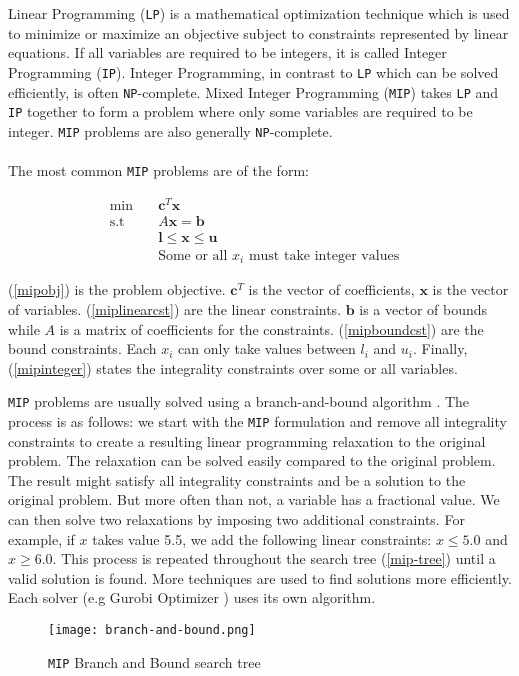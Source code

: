 \documentclass[../../thesis.tex]{subfiles}
\begin{document}
Linear Programming (\texttt{LP}) is a mathematical optimization technique which is used to minimize or maximize 
an objective subject to constraints represented by linear equations. 
If all variables are required to be integers, it is called Integer Programming (\texttt{IP}). 
Integer Programming, in contrast to \texttt{LP} which can be solved efficiently, is often \texttt{NP}-complete.  
Mixed Integer Programming (\texttt{MIP}) takes \texttt{LP} and \texttt{IP} together to form a problem where only some variables 
are required to be integer. \texttt{MIP} problems are also generally \texttt{NP}-complete.

\paragraph{}

The most common \texttt{MIP} problems are of the form:

\begin{align}
  \textrm{min} \quad & \bm{c}^T\bm{x} & \label{mipobj} \\ 
  \textrm{s.t} \quad & A\bm{x} = \bm{b} & \label{miplinearcst} \\
   & \bm{l} \leq \bm{x} \leq \bm{u} & \label{mipboundcst} \\
   & \text{Some or all $x_i$ must take integer values} \label{mipinteger}
\end{align}

(\ref{mipobj}) is the problem objective. $\bm{c}^T$ is the vector of coefficients, $\bm{x}$ is the vector of variables.
(\ref{miplinearcst}) are the linear constraints. $\bm{b}$ is a vector of bounds while $A$ is a matrix of coefficients for the constraints.
(\ref{mipboundcst}) are the bound constraints. Each $x_i$ can only take values between $l_i$ and $u_i$.
Finally, (\ref{mipinteger}) states the integrality constraints over some or all variables.


\texttt{MIP} problems are usually solved using a branch-and-bound algorithm \cite{mip-basics}.
The process is as follows: we start with the \texttt{MIP} formulation and remove all integrality constraints 
to create a resulting linear programming relaxation to the original problem. The relaxation can be solved 
easily compared to the original problem. The result might satisfy all integrality constraints and be a solution to the original problem.
But more often than not, a variable has a fractional value.
We can then solve two relaxations by imposing two additional constraints. For example, if $x$ takes value 5.5, we add the 
following linear constraints: $x \leq 5.0$ and $x \geq 6.0$. 
This process is repeated throughout the search tree (\autoref{mip-tree}) until a valid solution is found.
More techniques are used to find solutions more efficiently. Each solver (e.g Gurobi Optimizer \cite{mip-basics}) uses its
own algorithm.

\begin{figure}
  \centering
  \texttt{[image: branch-and-bound.png]}
  \caption{\texttt{MIP} Branch and Bound search tree \cite{mip-basics}}
  \label{mip-tree}
\end{figure}
\end{document}
